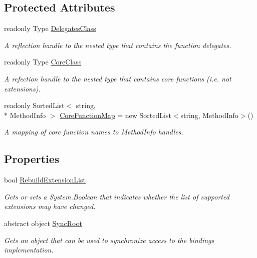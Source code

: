 \subsection*{Protected Attributes}
\begin{DoxyCompactItemize}
\item 
readonly Type \hyperlink{class_open_t_k_1_1_bindings_base_af8e7fd368c9a04ee49117cf9645f513b}{Delegates\-Class}
\begin{DoxyCompactList}\small\item\em A reflection handle to the nested type that contains the function delegates. \end{DoxyCompactList}\item 
readonly Type \hyperlink{class_open_t_k_1_1_bindings_base_a71af741beec4ce41b8c22d80419c7172}{Core\-Class}
\begin{DoxyCompactList}\small\item\em A refection handle to the nested type that contains core functions (i.\-e. not extensions). \end{DoxyCompactList}\item 
readonly Sorted\-List$<$ string, \\*
Method\-Info $>$ \hyperlink{class_open_t_k_1_1_bindings_base_a46c7960da59274e230c8651a13b10a62}{Core\-Function\-Map} = new Sorted\-List$<$string, Method\-Info$>$()
\begin{DoxyCompactList}\small\item\em A mapping of core function names to Method\-Info handles. \end{DoxyCompactList}\end{DoxyCompactItemize}
\subsection*{Properties}
\begin{DoxyCompactItemize}
\item 
bool \hyperlink{class_open_t_k_1_1_bindings_base_afb1af0b310e3cdcf1cb0302b9f5d283d}{Rebuild\-Extension\-List}
\begin{DoxyCompactList}\small\item\em Gets or sets a System.\-Boolean that indicates whether the list of supported extensions may have changed. \end{DoxyCompactList}\item 
abstract object \hyperlink{class_open_t_k_1_1_bindings_base_a0063e041acf286bac5b0518ae2c93bda}{Sync\-Root}
\begin{DoxyCompactList}\small\item\em Gets an object that can be used to synchronize access to the bindings implementation. \end{DoxyCompactList}\end{DoxyCompactItemize}


